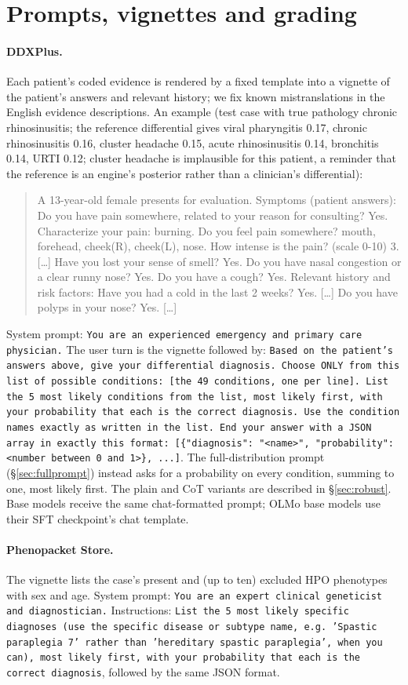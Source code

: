 \documentclass[11pt]{article}
\begin{document}
\section{Prompts, vignettes and grading}\label{app:prompts}
\sloppy
\paragraph{DDXPlus.} Each patient's coded evidence is rendered by a fixed template into a vignette of the patient's answers and relevant history; we fix known mistranslations in the English evidence descriptions. An example (test case with true pathology chronic rhinosinusitis; the reference differential gives viral pharyngitis 0.17, chronic rhinosinusitis 0.16, cluster headache 0.15, acute rhinosinusitis 0.14, bronchitis 0.14, URTI 0.12; cluster headache is implausible for this patient, a reminder that the reference is an engine's posterior rather than a clinician's differential):
\begin{quote}\small\ttfamily
A 13-year-old female presents for evaluation. Symptoms (patient answers): Do you have pain somewhere, related to your reason for consulting? Yes. Characterize your pain: burning. Do you feel pain somewhere? mouth, forehead, cheek(R), cheek(L), nose. How intense is the pain? (scale 0-10) 3. [\dots] Have you lost your sense of smell? Yes. Do you have nasal congestion or a clear runny nose? Yes. Do you have a cough? Yes. Relevant history and risk factors: Have you had a cold in the last 2 weeks? Yes. [\dots] Do you have polyps in your nose? Yes. [\dots]
\end{quote}
System prompt: \texttt{You are an experienced emergency and primary care physician.} The user turn is the vignette followed by: \texttt{Based on the patient's answers above, give your differential diagnosis. Choose ONLY from this list of possible conditions: [the 49 conditions, one per line]. List the 5 most likely conditions from the list, most likely first, with your probability that each is the correct diagnosis. Use the condition names exactly as written in the list. End your answer with a JSON array in exactly this format: [\{"diagnosis": "<name>", "probability": <number between 0 and 1>\}, ...]}. The full-distribution prompt (\S\ref{sec:fullprompt}) instead asks for a probability on every condition, summing to one, most likely first. The plain and CoT variants are described in \S\ref{sec:robust}. Base models receive the same chat-formatted prompt; OLMo base models use their SFT checkpoint's chat template.
\paragraph{Phenopacket Store.} The vignette lists the case's present and (up to ten) excluded HPO phenotypes with sex and age. System prompt: \texttt{You are an expert clinical geneticist and diagnostician.} Instructions: \texttt{List the 5 most likely specific diagnoses (use the specific disease or subtype name, e.g.\ 'Spastic paraplegia 7' rather than 'hereditary spastic paraplegia', when you can), most likely first, with your probability that each is the correct diagnosis}, followed by the same JSON format.
\end{document}
